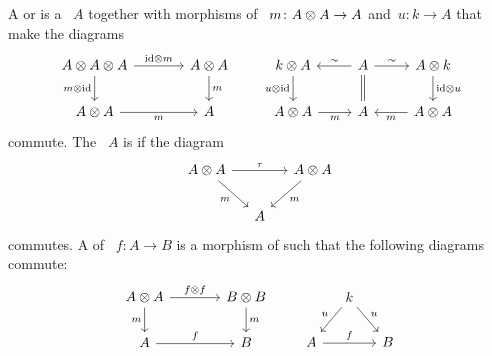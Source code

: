 \documentclass[a4paper,10pt,headings=standardclasses]{scrartcl}
\begin{document}
\begin{definition}
  A  or  is a {\dgv}~$A$ together with morphisms of {\dgvs}~$m \colon A \otimes A \to A$ and~$u \colon k \to A$ that make the diagrams
  \[
    \begin{tikzcd}[column sep = large]
      A \tensor A \tensor A
      \arrow{r}[above]{{\id} \tensor m}
      \arrow{d}[left]{m \tensor {\id}}
      &
      A \tensor A
      \arrow{d}[right]{m}
      \\
      A \tensor A
      \arrow{r}[below]{m}
      &
      A
    \end{tikzcd}
    \qquad
    \begin{tikzcd}
      k \tensor A
      \arrow{d}[left]{u \tensor {\id}}
      &
      A
      \arrow{l}[above]{\sim}
      \arrow[equal]{d}
      \arrow{r}[above]{\sim}
      &
      A \tensor k
      \arrow{d}[right]{{\id} \tensor u}
      \\
      A \tensor A
      \arrow{r}[below]{m}
      &
      A
      &
      A \tensor A
      \arrow{l}[below]{m}
    \end{tikzcd}
  \]
  commute.
  The {\dga}~$A$ is  if the diagram
  \[
    \begin{tikzcd}[column sep = small]
      A \tensor A
      \arrow{rr}[above]{\tau}
      \arrow{dr}[below left]{m}
      &
      {}
      &
      A \tensor A
      \arrow{dl}[below right]{m}
      \\
      {}
      &
      A
      &
      {}
    \end{tikzcd}
  \]
  commutes.
  A  of {\dgas}~$f \colon A \to B$ is a morphism of {\dgvs} such that the following diagrams commute:
  \[
    \begin{tikzcd}[column sep = large]
      A \tensor A
      \arrow{r}[above]{f \tensor f}
      \arrow{d}[left]{m}
      &
      B \tensor B
      \arrow{d}[right]{m}
      \\
      A
      \arrow{r}[above]{f}
      &
      B
    \end{tikzcd}
    \qquad
    \begin{tikzcd}[column sep = small]
      {}
      &
      k
      \arrow{dl}[above left]{u}
      \arrow{dr}[above right]{u}
      &
      {}
      \\
      A
      \arrow{rr}[above]{f}
      &
      {}
      &
      B
    \end{tikzcd}
  \]
\end{definition}
\end{document}
